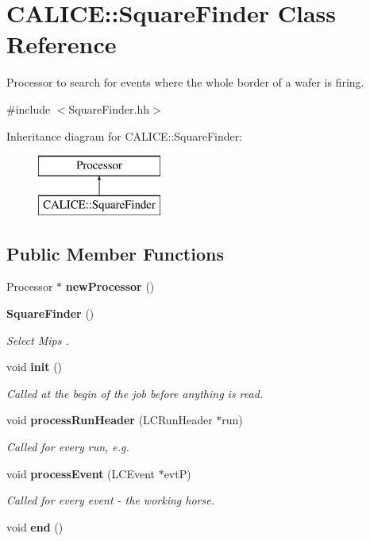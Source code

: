 \section{C\-A\-L\-I\-C\-E\-:\-:Square\-Finder Class Reference}
\label{classCALICE_1_1SquareFinder}


Processor to search for events where the whole border of a wafer is firing.  




{\ttfamily \#include $<$Square\-Finder.\-hh$>$}

Inheritance diagram for C\-A\-L\-I\-C\-E\-:\-:Square\-Finder\-:\begin{figure}[H]
\begin{center}
\leavevmode
\includegraphics[height=2.000000cm]{classCALICE_1_1SquareFinder}
\end{center}
\end{figure}
\subsection*{Public Member Functions}
\begin{DoxyCompactItemize}
\item 
Processor $\ast$ {\bfseries new\-Processor} ()\label{classCALICE_1_1SquareFinder_a3f2f49aba9c7f0d76d62de5a6c9e5ee1}

\item 
{\bf Square\-Finder} ()
\begin{DoxyCompactList}\small\item\em Select Mips . \end{DoxyCompactList}\item 
void {\bf init} ()
\begin{DoxyCompactList}\small\item\em Called at the begin of the job before anything is read. \end{DoxyCompactList}\item 
void {\bf process\-Run\-Header} (L\-C\-Run\-Header $\ast$run)
\begin{DoxyCompactList}\small\item\em Called for every run, e.\-g. \end{DoxyCompactList}\item 
void {\bf process\-Event} (L\-C\-Event $\ast$evt\-P)\label{classCALICE_1_1SquareFinder_ac15ccd383747f853c1480d687f9dba7f}

\begin{DoxyCompactList}\small\item\em Called for every event -\/ the working horse. \end{DoxyCompactList}\item 
void {\bfseries end} ()\label{classCALICE_1_1SquareFinder_a93abe832b780c7ce5616ca29d16c72ac}

\end{DoxyCompactItemize}
